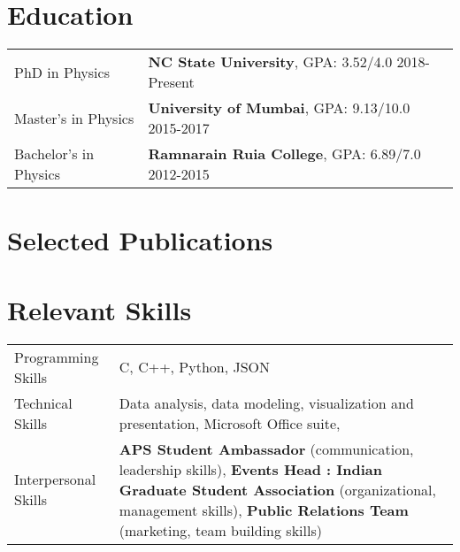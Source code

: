 \documentclass[a4paper,12pt]{article}
\begin{document}
\section{Education}
\begin{tabularx}{\linewidth}{@{}l X@{}}	
PhD in Physics & \textbf{NC State University}, GPA: 3.52/4.0 \hfill 2018-Present \\
Master's in Physics & \textbf{University of Mumbai}, GPA: 9.13/10.0 \hfill 2015-2017 \\ 
Bachelor's in Physics & \textbf{Ramnarain Ruia College}, GPA: 6.89/7.0 \hfill  2012-2015 \\

\end{tabularx}

\section{Selected Publications}
\begin{refsection}
\nocite{*}
\printbibliography[heading=none]
\end{refsection}

\section{Relevant Skills}
\begin{tabularx}{\linewidth}{@{}l X@{}}
Programming Skills &  \normalsize{C, C++, Python, JSON}\\
Technical Skills  &  \normalsize{Data analysis, data modeling, visualization and presentation, Microsoft Office suite, }\\
Interpersonal Skills  &  \normalsize{\textbf{APS Student Ambassador} (communication, leadership skills), \newline \textbf{Events Head : Indian Graduate Student Association} (organizational, management skills), \textbf{Public Relations Team} (marketing, team building skills)}\\
\end{tabularx}

\vfill
\end{document}
